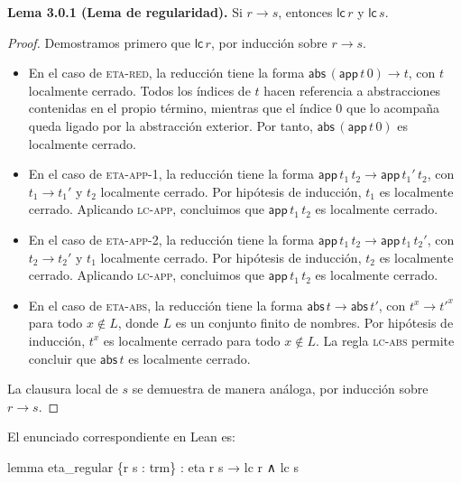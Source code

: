 \documentclass[
  spanish,
  letterpaper,
  DIV=11,
  numbers=noendperiod]{scrreprt}
\newenvironment{Shaded}{\begin{snugshade}}{\end{snugshade}}
\newcommand{\KeywordTok}[1]{\textcolor[rgb]{0.00,0.23,0.31}{\textbf{#1}}}
\newcommand{\NormalTok}[1]{\textcolor[rgb]{0.00,0.23,0.31}{#1}}
\renewcommand{\NormalTok}[1]{\textcolor[HTML]{000000}{#1}}
\renewcommand{\KeywordTok}[1]{\textcolor[HTML]{0000FF}{#1}}
\theoremstyle{remark}
\begin{document}
\textbf{Lema 3.0.1 (Lema de regularidad).} Si \(r\longrightarrow s\),
entonces \(\mathsf{lc}\,r\) y \(\mathsf{lc}\,s\).

\begin{proof}
Demostramos primero que \(\mathsf{lc}\,r\), por inducción sobre
\(r\longrightarrow s\).

\begin{itemize}
\item
  En el caso de \textsc{eta-red}, la reducción tiene la forma
  \(\mathsf{abs}\,(\mathsf{app}\,t\,0)\longrightarrow t\), con \(t\)
  localmente cerrado. Todos los índices de \(t\) hacen referencia a
  abstracciones contenidas en el propio término, mientras que el índice
  \(0\) que lo acompaña queda ligado por la abstracción exterior. Por
  tanto, \(\mathsf{abs}\,(\mathsf{app}\,t\,0)\) es localmente cerrado.
\item
  En el caso de \textsc{eta-app-1}, la reducción tiene la forma
  \(\mathsf{app}\,t_1\,t_2
  \longrightarrow\mathsf{app}\,t_1'\,t_2\), con
  \(t_1\longrightarrow t_1'\) y \(t_2\) localmente cerrado. Por
  hipótesis de inducción, \(t_1\) es localmente cerrado. Aplicando
  \textsc{lc-app}, concluimos que \(\mathsf{app}\,t_1\,t_2\) es
  localmente cerrado.
\item
  En el caso de \textsc{eta-app-2}, la reducción tiene la forma
  \(\mathsf{app}\,t_1\,t_2
  \longrightarrow\mathsf{app}\,t_1\,t_2'\), con
  \(t_2\longrightarrow t_2'\) y \(t_1\) localmente cerrado. Por
  hipótesis de inducción, \(t_2\) es localmente cerrado. Aplicando
  \textsc{lc-app}, concluimos que \(\mathsf{app}\,t_1\,t_2\) es
  localmente cerrado.
\item
  En el caso de \textsc{eta-abs}, la reducción tiene la forma
  \(\mathsf{abs}\,t\longrightarrow\mathsf{abs}\,t'\), con
  \(t^x\longrightarrow t'^x\) para todo \(x\notin L\), donde \(L\) es un
  conjunto finito de nombres. Por hipótesis de inducción, \(t^x\) es
  localmente cerrado para todo \(x\notin L\). La regla \textsc{lc-abs}
  permite concluir que \(\mathsf{abs}\,t\) es localmente cerrado.
\end{itemize}

La clausura local de \(s\) se demuestra de manera análoga, por inducción
sobre \(r\longrightarrow s\).
\end{proof}

El enunciado correspondiente en Lean es:

\begin{Shaded}
\begin{Highlighting}[]
\KeywordTok{lemma}\NormalTok{ eta\_regular \{r s : trm\} :}
\NormalTok{    eta r s → lc r ∧ lc s}
\end{Highlighting}
\end{Shaded}
\end{document}
